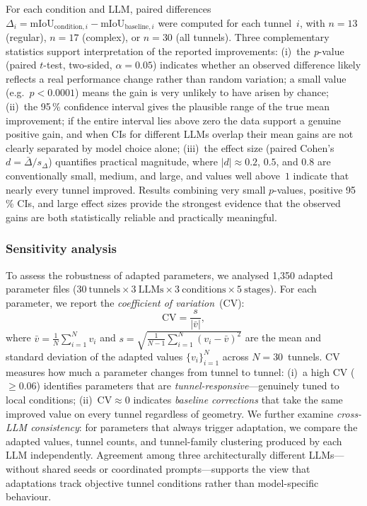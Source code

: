 \documentclass[a4paper,fleqn]{cas-dc}
\begin{document}
For each condition and LLM, paired differences $\Delta_i = \text{mIoU}_{\text{condition},i} - \text{mIoU}_{\text{baseline},i}$ were computed for each tunnel~$i$, with $n = 13$ (regular), $n = 17$ (complex), or $n = 30$ (all tunnels). Three complementary statistics support interpretation of the reported improvements: (i)~the \emph{p}-value (paired $t$-test, two-sided, $\alpha = 0.05$) indicates whether an observed difference likely reflects a real performance change rather than random variation; a small value (e.g.\ $p < 0.0001$) means the gain is very unlikely to have arisen by chance; (ii)~the 95\,\% confidence interval gives the plausible range of the true mean improvement; if the entire interval lies above zero the data support a genuine positive gain, and when CIs for different LLMs overlap their mean gains are not clearly separated by model choice alone; (iii)~the effect size (paired Cohen's $d = \bar{\Delta}/s_\Delta$) quantifies practical magnitude, where $|d| \approx 0.2$, $0.5$, and $0.8$ are conventionally small, medium, and large, and values well above~$1$ indicate that nearly every tunnel improved. Results combining very small $p$-values, positive 95\,\% CIs, and large effect sizes provide the strongest evidence that the observed gains are both statistically reliable and practically meaningful.


\subsubsection{Sensitivity analysis}\label{sec:sensitivity-method}

To assess the robustness of adapted parameters, we analysed 1{,}350 adapted parameter files ($30~\text{tunnels} \times 3~\text{LLMs} \times 3~\text{conditions} \times 5~\text{stages}$). For each parameter, we report the \emph{coefficient of variation}~(CV):
\begin{equation}\label{eq:cv}
\text{CV} = \frac{s}{\lvert\bar{v}\rvert},
\end{equation}
where $\bar{v} = \frac{1}{N}\sum_{i=1}^{N} v_i$ and $s = \sqrt{\frac{1}{N-1}\sum_{i=1}^{N}(v_i - \bar{v})^2}$ are the mean and standard deviation of the adapted values $\{v_i\}_{i=1}^{N}$ across $N = 30$~tunnels. CV measures how much a parameter changes from tunnel to tunnel: (i)~a high CV ($\geq 0.06$) identifies parameters that are \emph{tunnel-responsive}---genuinely tuned to local conditions; (ii)~$\text{CV} \approx 0$ indicates \emph{baseline corrections} that take the same improved value on every tunnel regardless of geometry. We further examine \emph{cross-LLM consistency}: for parameters that always trigger adaptation, we compare the adapted values, tunnel counts, and tunnel-family clustering produced by each LLM independently. Agreement among three architecturally different LLMs---without shared seeds or coordinated prompts---supports the view that adaptations track objective tunnel conditions rather than model-specific behaviour.
\end{document}
